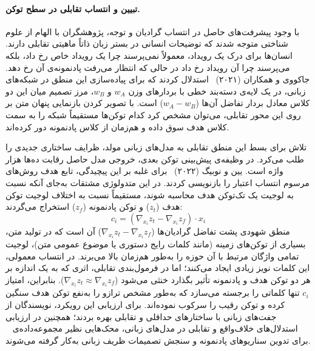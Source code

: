 \paragraph{تبیین و انتساب تقابلی در سطح توکن.}

با وجود پیشرفت‌های حاصل در انتساب گرادیان و توجه، پژوهشگران با الهام از علوم شناختی متوجه شدند که توضیحات انسانی در بستر زبان ذاتاً ماهیتی تقابلی دارند. انسان‌ها برای درک یک رویداد، معمولاً نمی‌پرسند چرا یک رویداد خاص رخ داد، بلکه می‌پرسند چرا آن رویداد رخ داد در حالی که انتظار می‌رفت پادنمونه‌ی آن رخ دهد. جاکووی و همکاران (۲۰۲۱)~\cite{jacovi2021contrastive} استدلال کردند که برای پیاده‌سازی این منطق در شبکه‌های زبانی، در یک لایه‌ی دسته‌بند خطی با بردارهای وزن $w_A$ و $w_B$، مرز تصمیم میان این دو کلاس معادل بردار تفاضل آن‌ها ($w_A - w_B$) است. با تصویر کردن بازنمایی پنهان متن بر روی این محور تقابلی، می‌توان مشخص کرد کدام توکن‌ها مستقیماً شبکه را به سمت کلاس هدف سوق داده و هم‌زمان از کلاس پادنمونه دور کرده‌اند.

تلاش برای بسط این منطق تقابلی به مدل‌های زبانی مولد، ظرایف ساختاری جدیدی را طلب می‌کرد. در وظیفه‌ی پیش‌بینی توکن بعدی، خروجی مدل حاصل رقابت ده‌ها هزار واژه است. یین و نوبیگ (۲۰۲۲)~\cite{yin2022interpreting} برای غلبه بر این پیچیدگی، تابع هدف روش‌های مرسوم انتساب اعتبار را بازنویسی کردند. در این متدولوژی مشتقات به‌جای آنکه نسبت به لوجیت یک تک‌توکن هدف محاسبه شوند، مستقیماً نسبت به اختلاف لوجیت توکن هدف ($z_t$) و توکن پادنمونه ($z_f$) استخراج می‌گردند:
\begin{equation}\label{eq:chap3_contrastive_attribution}
    c_i = \left( \nabla_{x_i} z_t - \nabla_{x_i} z_f \right) \cdot x_i
\end{equation}
منطق شهودی پشت تفاضل گرادیان‌ها ($\nabla_{x_i} z_t - \nabla_{x_i} z_f$) آن است که در تولید متن، بسیاری از توکن‌های زمینه (مانند کلمات رایج دستوری یا موضوع عمومی متن)، لوجیت تمامی واژگان مرتبط با آن حوزه را به‌طور هم‌زمان بالا می‌برند. در انتساب معمولی، این کلمات نویز زیادی ایجاد می‌کنند؛ اما در فرمول‌بندی تقابلی، اثری که به یک اندازه بر هر دو توکن هدف و پادنمونه تأثیر بگذارد خنثی می‌شود ($\nabla_{x_i} z_t \approx \nabla_{x_i} z_f$). بنابراین، امتیاز $c_i$ تنها کلماتی را برجسته می‌سازد که به‌طور مشخص ترازو را به‌نفع توکن هدف سنگین کرده و توکن رقیب را سرکوب نموده‌اند. برای ارزیابی این رویکرد، نویسندگان از جفت‌های زبانی با ساختارهای حداقلی و تقابلی بهره بردند؛ همچنین در ارزیابی استدلال‌های خلاف‌واقع و تقابلی در مدل‌های زبانی، محک‌هایی نظیر مجموعه‌داده‌ی ~\cite{frohberg2022crass} برای تدوین سناریوهای پادنمونه و سنجش تصمیمات ظریف زبانی به‌کار گرفته می‌شوند.

